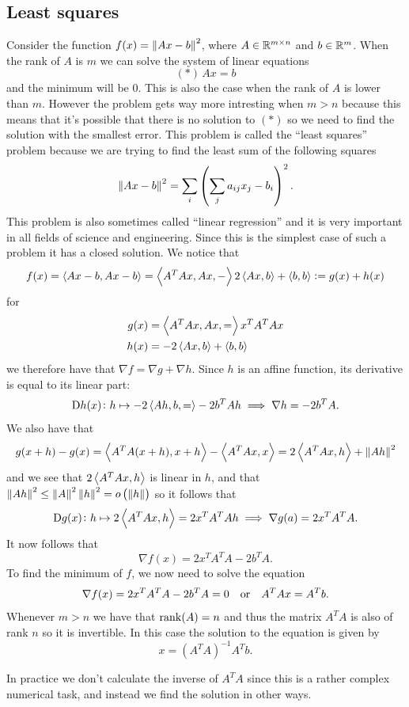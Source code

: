 \documentclass[11pt,a4paper]{article}
\begin{document}
\subsection{Least squares}
Consider the function $f(x) = \left\lVert Ax - b\right\rVert^2$, where $A \in \mathbb{R}^{m \times n}$
and $b \in \mathbb{R}^m$.
When the rank of $A$ is $m$ we can solve the system of linear equations
\[
  (*)\,Ax = b
\]
and the minimum will be $0$.
This is also the case when the rank of $A$ is lower than $m$.
However the problem gets way more intresting when $m > n$ because this means
that it's possible that there is no solution to $(*)$ so we need to find
the solution with the smallest error.
This problem is called the ``least squares'' problem because we are trying
to find the least sum of the following squares
\[
  \norm{Ax - b}^2 = \sum_{i}\del{\sum_{j} a_{ij} x_{j} - b_{i}}^2.
\]
This problem is also sometimes called ``linear regression'' and it is very
important in all fields of science and engineering.
Since this is the simplest case of such a problem it has a closed solution.
We notice that
\[
  f(x) = \left\langle Ax - b, Ax - b \right\rangle =
  \left\langle A^T Ax, Ax, - \right\rangle 2 \left\langle Ax, b \right\rangle + \left\langle b, b \right\rangle :=
  g(x) + h(x)
\]
for
\begin{align*}
  g(x) &= \left\langle A^T Ax, Ax, = \right\rangle x^T A^T A x \\
  h(x) &= - 2 \left\langle Ax, b \right\rangle + \left\langle b, b \right\rangle
\end{align*}
we therefore have that $\nabla f = \nabla g + \nabla h$.
Since $h$ is an affine function, its derivative is equal to its linear part:
\[
  \mathrm{D} h(x) \colon h \mapsto - 2 \left\langle Ah, b, = \right\rangle - 2 b^T A h \implies
  \nabla h = - 2 b^T A.
\]
We also have that
\[
  g(x + h) - g(x) = \left\langle A^T A (x + h), x + h \right\rangle - \left\langle A^T A x, x \right\rangle =
  2 \left\langle A^T A x, h \right\rangle + \left\lVert A h\right\rVert^2
\]
and we see that $2 \left\langle A^T A x, h \right\rangle$ is linear in $h$, and that
$\norm{A h}^2 \le \norm{A}^2 \norm{h}^2 = o\del{\norm h}$ so it follows
that
\[
  \mathrm{D} g(x) \colon h \mapsto 2 \left\langle A^T A x, h \right\rangle = 2 x^T A^T A h \implies
  \nabla g(a) = 2 x^T A^T A.
\]
It now follows that
\[
  \nabla f(x) = 2 x^T A^T A - 2 b^T A.
\]
To find the minimum of $f$, we now need to solve the equation
\[
  \nabla f(x) = 2 x^T A^T A - 2 b^T A = 0 \quad \text{or} \quad
  A^T A x = A^T b.
\]
Whenever $m > n$ we have that $\operatorname{rank}(A) = n$ and thus the matrix 
$A^T A$ is also of rank $n$ so it is invertible.
In this case the solution to the equation is given by
\[
  x = (A^T A)^{-1} A^T b.
\]
\begin{remark}
  In practice we don't calculate the inverse of $A^T A$ since this is a rather
  complex numerical task, and instead we find the solution in other ways.
\end{remark}
\end{document}
